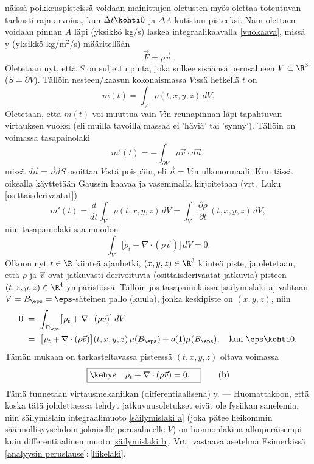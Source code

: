 näissä poikkeuspisteissä voidaan mainittujen oletusten myös olettaa toteutuvan tarkasti
raja-arvoina, kun $\Delta t \kohti 0$ ja $\Delta A$ kutistuu pisteeksi. Näin olettaen voidaan
 pinnan $A$ läpi (yksikkö kg/s) laskea integraalikaavalla \eqref{vuokaava},
missä  y (yksikkö kg/m$^2$/s) määritellään
\[
\vec F = \rho\vec v.
\]
Oletetaan nyt, että $S$ on suljettu pinta, joka sulkee sisäänsä perusalueen $V\subset\R^3$ 
($S=\partial V$). Tällöin nesteen/kaasun kokonaismassa $V$:ssä hetkellä $t$ on
\[
m(t) = \int_V \rho(t,x,y,z)\,dV.
\]
Oletetaan, että $m(t)$ voi muuttua vain $V$:n reunapinnan läpi tapahtuvan virtauksen vuoksi
(eli muilla tavoilla massaa ei 'häviä' tai 'synny'). Tällöin on voimassa tasapainolaki
\[
m'(t) = -\int_{\partial V} \rho\vec v\cdot d\vec a,
\]
missä $d\vec a=\vec n dS$ osoittaa $V$:stä poispäin, eli $\vec n=V$:n ulkonormaali. Kun tässä
oikealla käyttetään Gaussin kaavaa ja vasemmalla kirjoitetaan (vrt.\ Luku 
\ref{osittaisderivaatat})
\[
m'(t) = \frac{d}{dt}\int_V \rho(t,x,y,z)\,dV 
      = \int_V \frac{\partial \rho}{\partial t}\,(t,x,y,z)\,dV,
\]
niin tasapainolaki saa muodon
\begin{equation} \label{säilymislaki a}
\int_V \bigl[\rho_t+\nabla\cdot(\rho\vec v)\bigr]\,dV=0. \tag{a}
\end{equation}
Olkoon nyt $t\in\R$ kiinteä ajanhetki, $(x,y,z)\in\R^3$ kiinteä piste, ja oletetaan, että $\rho$
ja $\vec v$ ovat jatkuvasti derivoituvia (osittaisderivaatat jatkuvia) pisteen
$(t,x,y,z)\in\R^4$ ympäristössä. Tällöin jos tasapainolaissa \eqref{säilymislaki a} valitaan
$V=B_\eps=\eps$-säteinen pallo (kuula), jonka keskipiste on $(x,y,z)$, niin
\begin{align*}
0\ &=\ \int_{B_\eps}\bigl[\rho_t+\nabla\cdot(\rho\vec v)\bigr]\,dV \\
   &=\ \bigl[\rho_t+\nabla\cdot(\rho\vec v)\bigr](t,x,y,z)\,\mu(B_\eps)
         + o(1)\mu(B_\eps), \quad \text{kun}\ \eps \kohti 0.
\end{align*}
Tämän mukaan on tarkasteltavassa pisteessä $(t,x,y,z)$ oltava voimassa
\begin{equation} \label{säilymislaki b}
\boxed{\kehys\quad \rho_t + \nabla\cdot(\rho\vec v)=0. \quad} \tag{b}
\end{equation}
Tämä tunnetaan virtausmekaniikan (differentiaalisena) 
y. --- Huomattakoon, että koska tätä johdettaessa tehdyt
jatkuvuusoletukset eivät ole fysiikan sanelemia, niin säilymislain integraalimuoto
\eqref{säilymislaki a} (joka pätee heikommin säännöllisyysehdoin jokaiselle perusalueelle $V$)
on luonnonlakina alkuperäisempi kuin differentiaalinen muoto \eqref{säilymislaki b}.
Vrt.\ vastaava asetelma Esimerkissä \ref{analyysin peruslause}:\,\ref{liikelaki}.


